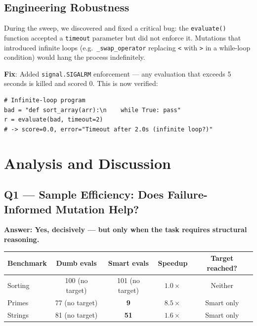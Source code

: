 \documentclass[11pt,a4paper]{article}
\begin{document}
\subsection{Engineering Robustness}

During the sweep, we discovered and fixed a critical bug: the \texttt{evaluate()}
function accepted a \texttt{timeout} parameter but did not enforce it. Mutations
that introduced infinite loops (e.g.\ \texttt{\_swap\_operator} replacing
\texttt{<} with \texttt{>} in a while-loop condition) would hang the process
indefinitely.

\textbf{Fix}: Added \texttt{signal.SIGALRM} enforcement — any evaluation that
exceeds 5 seconds is killed and scored 0. This is now verified:

\begin{lstlisting}
# Infinite-loop program
bad = "def sort_array(arr):\n    while True: pass"
r = evaluate(bad, timeout=2)
# -> score=0.0, error="Timeout after 2.0s (infinite loop?)"
\end{lstlisting}

\section{Analysis and Discussion}

\subsection{Q1 — Sample Efficiency: Does Failure-Informed Mutation Help?}

\textbf{Answer: Yes, decisively — but only when the task requires structural reasoning.}

\begin{center}
\begin{tabular}{lcccc}
\toprule
\textbf{Benchmark} & \textbf{Dumb evals} & \textbf{Smart evals} & \textbf{Speedup} & \textbf{Target reached?} \\
\midrule
Sorting  & 100 (no target) & 101 (no target) & $1.0\times$ & Neither \\
Primes   & 77  (no target) & \textbf{9}      & $\mathbf{8.5\times}$ & Smart only \\
Strings  & 81  (no target) & \textbf{51}     & $\mathbf{1.6\times}$ & Smart only \\
\bottomrule
\end{tabular}
\end{center}
\end{document}
